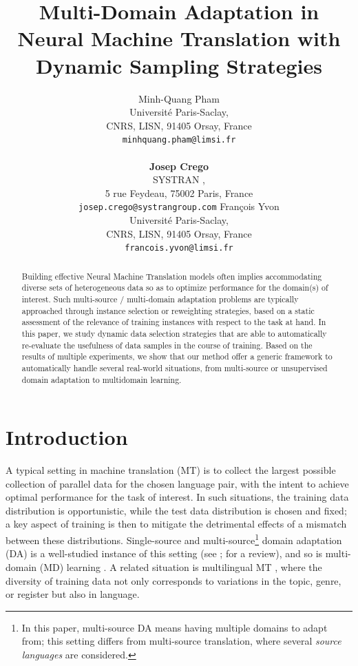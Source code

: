 \documentclass[11pt]{article}
\title{Multi-Domain Adaptation in Neural Machine Translation with Dynamic Sampling Strategies}
\author{Minh-Quang Pham\\
  Universit\'e Paris-Saclay, \\
  CNRS, LISN,  91405 Orsay, France \\
  {\tt minhquang.pham@limsi.fr}  \\ \\
  \textbf{Josep Crego}\\
  SYSTRAN ,\\
  5 rue Feydeau, 75002 Paris, France\\
  {\tt josep.crego@systrangroup.com} \And
  Fran\c cois Yvon\\
  Universit\'e Paris-Saclay, \\
  CNRS, LISN,  91405 Orsay, France\\
  {\tt francois.yvon@limsi.fr}}
\date{}
\newcommand{\fyDone}[1]{\done[FY]\Todo[FY:]{\textcolor{orange}{#1}}}
\newcommand{\revision}[1]{\textcolor{red}{#1}}
\begin{document}
\maketitle
\setlength{\abovedisplayskip}{2pt}
\setlength{\belowdisplayskip}{2pt}
\begin{abstract}
  Building effective Neural Machine Translation models often implies accommodating diverse sets of heterogeneous data so as to optimize performance for the domain(s) of interest. Such multi-source / multi-domain adaptation problems are typically approached through instance selection or reweighting strategies, based on a static assessment of the relevance of training instances with respect to the task at hand. In this paper, we study dynamic data selection strategies that are able to automatically re-evaluate the usefulness of data samples
  in the course of training. Based on the results of multiple experiments, we show that our method offer a generic framework to automatically
  handle several real-world situations, from multi-source or unsupervised domain adaptation to multidomain learning.
\end{abstract}

\section{Introduction}\label{sec:intro}
A typical setting in machine translation (MT) is to collect the largest possible collection of parallel data for the chosen language pair, with the intent to achieve optimal performance for the task of interest. In such situations, the training data distribution is opportunistic, while the test data distribution is chosen and fixed; a key aspect of training is then to mitigate the detrimental effects of a mismatch between these distributions. Single-source and multi-source\footnote{In this paper, multi-source DA means having multiple domains to adapt from; this setting differs from multi-source translation, where several \emph{source languages} are considered.} domain adaptation (DA) is a well-studied instance of this setting (see ;  for a review), and so is multi-domain (MD) learning \cite{Chu18multilingual,Zeng18multidomain,Jiang19multidomain,Pham21revisiting}. A related situation is multilingual MT \cite{Firat16multiway,Ha16towards,Johnson17google,Aharoni19massively},\fyDone{Fix ref}
where the diversity of training data not only corresponds to variations in the topic, genre, or register but also in language.
\end{document}
